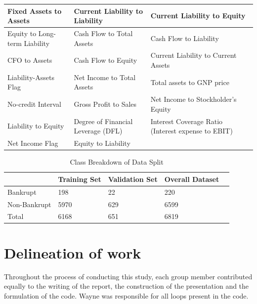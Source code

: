 \documentclass[12pt]{report}
\begin{document}
\begin{table}[H]
\begin{adjustbox}{width=\columnwidth,center}
\begin{tabular}{|l|l|l|}
Fixed Assets to Assets                                  & Current Liability to Liability              & Current Liability to Equity                        \\ \hline
Equity to Long-term Liability                           & Cash Flow to Total Assets                   & Cash Flow to Liability                             \\ \hline
CFO to Assets                                           & Cash Flow to Equity                         & Current Liability to Current Assets                \\ \hline
Liability-Assets Flag                                   & Net Income to Total Assets                  & Total assets to GNP price                          \\ \hline
No-credit Interval                                      & Gross Profit to Sales                       & Net Income to Stockholder's Equity                 \\ \hline
Liability to Equity                                     & Degree of Financial Leverage (DFL)          & Interest Coverage Ratio (Interest expense to EBIT) \\ \hline
Net Income Flag                                         & Equity to Liability                         &                                                    \\ \hline
\end{tabular}
\end{adjustbox}
\end{table}

\begin{table}[H]
\caption{Class Breakdown of Data Split} \label{tab:Split}
\begin{tabular}{lllll}
\hline
             & Training Set & Validation Set & Overall Dataset &  \\ \hline
Bankrupt     & 198          & 22             & 220            &  \\
Non-Bankrupt & 5970         & 629            & 6599           &  \\ \hline
Total        & 6168         & 651            & 6819           & 

\end{tabular}
\end{table}

\chapter{Delineation of work}

Throughout the process of conducting this study, each group member contributed equally to the writing of the report, the construction of the presentation and the formulation of the code. Wayne was responsible for all loops present in the code.
\end{document}
